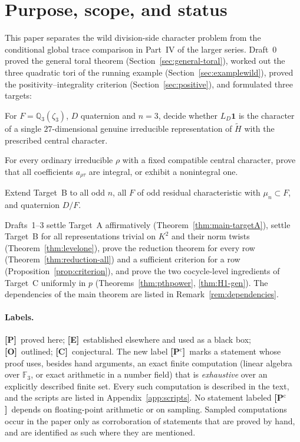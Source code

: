 \documentclass[11pt]{article}
\newcommand{\Q}{\mathbb Q}
\newcommand{\Fq}{\mathbb F}
\newcommand{\tH}{\widetilde H}
\newcommand{\Ptag}{\textnormal{\textbf{[P]}}}
\newcommand{\Pctag}{\textnormal{\textbf{[P$^{\mathrm c}$]}}}
\newcommand{\Etag}{\textnormal{\textbf{[E]}}}
\newcommand{\Otag}{\textnormal{\textbf{[O]}}}
\newcommand{\Ctag}{\textnormal{\textbf{[C]}}}
\theoremstyle{plain}
\theoremstyle{definition}
\begin{document}
\section{Purpose, scope, and status}\label{sec:intro}
This paper separates the wild division-side character problem from the
conditional global trace comparison in Part~IV of the larger series.
Draft~0 proved the general toral theorem (Section~\ref{sec:general-toral}),
worked out the three quadratic tori of the running example
(Section~\ref{sec:examplewild}), proved the positivity--integrality
criterion (Section~\ref{sec:positive}), and formulated three targets:
\begin{description}[style=nextline]
\item[Target A] For $F=\Q_3(\zeta_3)$, $D$ quaternion and $n=3$, decide
whether $L_D\mathbf1$ is the character of a single $27$-dimensional
genuine irreducible representation of $\tH$ with the prescribed central
character.
\item[Target B] For every ordinary irreducible $\rho$ with a fixed
compatible central character, prove that all coefficients $a_{\rho\tau}$
are integral, or exhibit a nonintegral one.
\item[Target C] Extend Target~B to all odd $n$, all $F$ of odd residual
characteristic with $\mu_n\subset F$, and quaternion $D/F$.
\end{description}
Drafts~1--3 settle Target~A affirmatively (Theorem~\ref{thm:main-targetA}),
settle Target~B for all representations trivial on $K^2$ and their norm
twists (Theorem~\ref{thm:levelone}), prove the reduction theorem for
every row (Theorem~\ref{thm:reduction-all}) and a sufficient criterion
for a row (Proposition~\ref{prop:criterion}), and prove the two
cocycle-level ingredients of Target~C uniformly in $p$
(Theorems~\ref{thm:pthpower}, \ref{thm:H1-gen}).  The dependencies of
the main theorem are listed in Remark~\ref{rem:dependencies}.

\paragraph{Labels.}
\Ptag\ proved here; \Etag\ established elsewhere and used as a black
box; \Otag\ outlined; \Ctag\ conjectural.  The new label \Pctag\ marks
a statement whose proof uses, besides hand arguments, an exact finite
computation (linear algebra over $\Fq_3$, or exact arithmetic in a
number field) that is \emph{exhaustive} over an explicitly described
finite set.  Every such computation is described in the text, and the
scripts are listed in Appendix~\ref{app:scripts}.  No statement
labeled \Pctag\ depends on floating-point arithmetic or on sampling.
Sampled computations occur in the paper only as corroboration of
statements that are proved by hand, and are identified as such where
they are mentioned.
\end{document}
